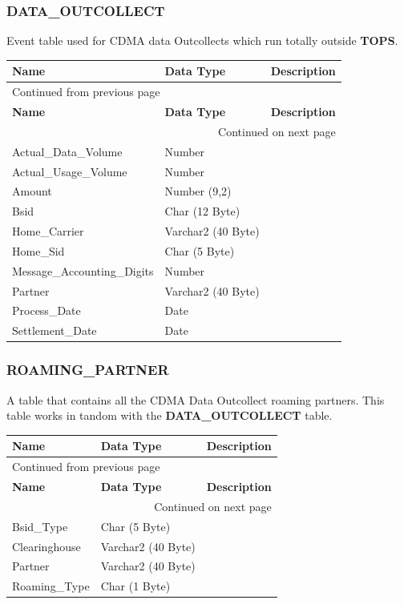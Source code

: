 \documentclass[12pt,twoside]{article}
\begin{document}
\subsubsection{DATA\_OUTCOLLECT}
\label{sec:orgheadline72}
Event table used for CDMA data Outcollects which run totally outside \textbf{TOPS}.
\footnotesize
\begin{longtable}{l|l|l}
\hline
\textbf{Name} & \textbf{Data Type} & \textbf{Description}\\
\hline
\endfirsthead
\multicolumn{3}{l}{Continued from previous page} \\
\hline

\textbf{Name} & \textbf{Data Type} & \textbf{Description} \\

\hline
\endhead
\hline\multicolumn{3}{r}{Continued on next page} \\
\endfoot
\endlastfoot
\hline
Actual\_Data\_Volume & Number & \\
Actual\_Usage\_Volume & Number & \\
Amount & Number (9,2) & \\
Bsid & Char (12 Byte) & \\
Home\_Carrier & Varchar2 (40 Byte) & \\
Home\_Sid & Char (5 Byte) & \\
Message\_Accounting\_Digits & Number & \\
Partner & Varchar2 (40 Byte) & \\
Process\_Date & Date & \\
Settlement\_Date & Date & \\
\hline
\end{longtable}
\normalsize
\subsubsection{ROAMING\_PARTNER}
\label{sec:orgheadline73}
A table that contains all the CDMA Data Outcollect roaming partners. This table
works in tandom with the \textbf{DATA\_OUTCOLLECT} table.

\footnotesize
\begin{longtable}{l|l|l}
\hline
\textbf{Name} & \textbf{Data Type} & \textbf{Description}\\
\hline
\endfirsthead
\multicolumn{3}{l}{Continued from previous page} \\
\hline

\textbf{Name} & \textbf{Data Type} & \textbf{Description} \\

\hline
\endhead
\hline\multicolumn{3}{r}{Continued on next page} \\
\endfoot
\endlastfoot
\hline
Bsid\_Type & Char (5 Byte) & \\
Clearinghouse & Varchar2 (40 Byte) & \\
Partner & Varchar2 (40 Byte) & \\
Roaming\_Type & Char (1 Byte) & \\
\hline
\end{longtable}
\normalsize
\end{document}
